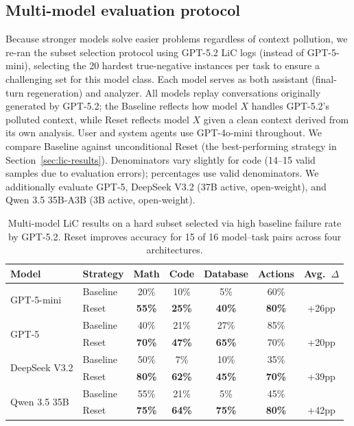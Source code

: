 \documentclass{article}
\begin{document}
\subsection{Multi-model evaluation protocol}
\label{app:multi-model-protocol}

Because stronger models solve easier problems regardless of context pollution, we re-ran the subset selection protocol using GPT-5.2 LiC logs (instead of GPT-5-mini), selecting the 20 hardest true-negative instances per task to ensure a challenging set for this model class. Each model serves as both assistant (final-turn regeneration) and analyzer. All models replay conversations originally generated by GPT-5.2; the Baseline reflects how model $X$ handles GPT-5.2's polluted context, while Reset reflects model $X$ given a clean context derived from its own analysis. User and system agents use GPT-4o-mini throughout. We compare Baseline against unconditional Reset (the best-performing strategy in Section~\ref{sec:lic-results}). Denominators vary slightly for code (14--15 valid samples due to evaluation errors); percentages use valid denominators. We additionally evaluate GPT-5, DeepSeek V3.2 (37B active, open-weight), and Qwen 3.5 35B-A3B (3B active, open-weight).

\begin{table}[h]
\centering
\begin{tabular}{llccccc}
\toprule
\textbf{Model} & \textbf{Strategy} & \textbf{Math} & \textbf{Code} & \textbf{Database} & \textbf{Actions} & \textbf{Avg.\ $\Delta$} \\
\midrule
\multirow{2}{*}{GPT-5-mini} & Baseline & 20\% & 10\% & 5\% & 60\% & \\
 & Reset & \textbf{55\%} & \textbf{25\%} & \textbf{40\%} & \textbf{80\%} & +26pp \\
\midrule
\multirow{2}{*}{GPT-5} & Baseline & 40\% & 21\% & 27\% & 85\% & \\
 & Reset & \textbf{70\%} & \textbf{47\%} & \textbf{65\%} & 70\% & +20pp \\
\midrule
\multirow{2}{*}{DeepSeek V3.2} & Baseline & 50\% & 7\% & 10\% & 35\% & \\
 & Reset & \textbf{80\%} & \textbf{62\%} & \textbf{45\%} & \textbf{70\%} & +39pp \\
\midrule
\multirow{2}{*}{Qwen 3.5 35B} & Baseline & 55\% & 21\% & 5\% & 45\% & \\
 & Reset & \textbf{75\%} & \textbf{64\%} & \textbf{75\%} & \textbf{80\%} & +42pp \\
\bottomrule
\end{tabular}
\caption{Multi-model LiC results on a hard subset selected via high baseline failure rate by GPT-5.2. Reset improves accuracy for 15 of 16 model--task pairs across four architectures.}
\label{tab:multi-model}
\end{table}
\end{document}
